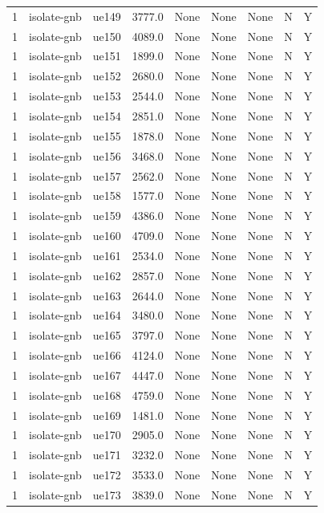 \begin{table}[ht]
\begin{tabular}{|c|c|c|c|c|c|c|c|c|}
1 & isolate-gnb & ue149 & 3777.0 & None & None & None & N & Y \\
1 & isolate-gnb & ue150 & 4089.0 & None & None & None & N & Y \\
1 & isolate-gnb & ue151 & 1899.0 & None & None & None & N & Y \\
1 & isolate-gnb & ue152 & 2680.0 & None & None & None & N & Y \\
1 & isolate-gnb & ue153 & 2544.0 & None & None & None & N & Y \\
1 & isolate-gnb & ue154 & 2851.0 & None & None & None & N & Y \\
1 & isolate-gnb & ue155 & 1878.0 & None & None & None & N & Y \\
1 & isolate-gnb & ue156 & 3468.0 & None & None & None & N & Y \\
1 & isolate-gnb & ue157 & 2562.0 & None & None & None & N & Y \\
1 & isolate-gnb & ue158 & 1577.0 & None & None & None & N & Y \\
1 & isolate-gnb & ue159 & 4386.0 & None & None & None & N & Y \\
1 & isolate-gnb & ue160 & 4709.0 & None & None & None & N & Y \\
1 & isolate-gnb & ue161 & 2534.0 & None & None & None & N & Y \\
1 & isolate-gnb & ue162 & 2857.0 & None & None & None & N & Y \\
1 & isolate-gnb & ue163 & 2644.0 & None & None & None & N & Y \\
1 & isolate-gnb & ue164 & 3480.0 & None & None & None & N & Y \\
1 & isolate-gnb & ue165 & 3797.0 & None & None & None & N & Y \\
1 & isolate-gnb & ue166 & 4124.0 & None & None & None & N & Y \\
1 & isolate-gnb & ue167 & 4447.0 & None & None & None & N & Y \\
1 & isolate-gnb & ue168 & 4759.0 & None & None & None & N & Y \\
1 & isolate-gnb & ue169 & 1481.0 & None & None & None & N & Y \\
1 & isolate-gnb & ue170 & 2905.0 & None & None & None & N & Y \\
1 & isolate-gnb & ue171 & 3232.0 & None & None & None & N & Y \\
1 & isolate-gnb & ue172 & 3533.0 & None & None & None & N & Y \\
1 & isolate-gnb & ue173 & 3839.0 & None & None & None & N & Y \\

\end{tabular}
\end{table}
